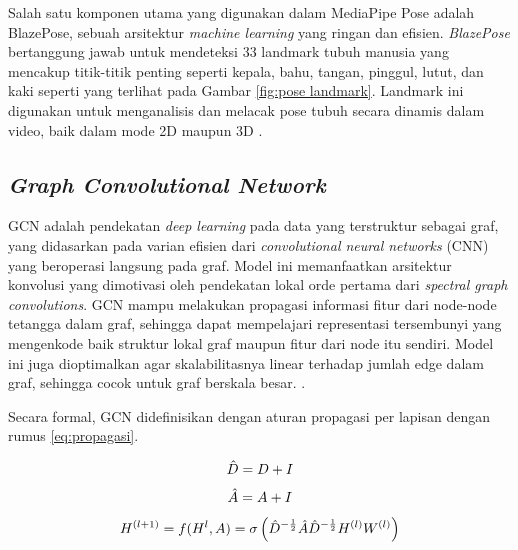 Salah satu komponen utama yang digunakan dalam MediaPipe Pose adalah BlazePose, sebuah arsitektur \textit{machine learning} yang ringan dan efisien. \textit{BlazePose} bertanggung jawab untuk mendeteksi 33 landmark tubuh manusia yang mencakup titik-titik penting seperti kepala, bahu, tangan, pinggul, lutut, dan kaki seperti yang terlihat pada Gambar \ref{fig:pose landmark}. Landmark ini digunakan untuk menganalisis dan melacak pose tubuh secara dinamis dalam video, baik dalam mode 2D maupun 3D \cite{bazarevsky2020}.\par

\subsection{\textit{Graph Convolutional Network}} \label{II.GCN}
GCN adalah pendekatan \textit{deep learning} pada data yang terstruktur sebagai graf, yang didasarkan pada varian efisien dari \textit{convolutional neural networks} (CNN) yang beroperasi langsung pada graf.  Model ini memanfaatkan arsitektur konvolusi yang dimotivasi oleh pendekatan lokal orde pertama dari \textit{spectral graph convolutions}. GCN mampu melakukan propagasi informasi fitur dari node-node tetangga dalam graf, sehingga dapat mempelajari representasi tersembunyi yang mengenkode baik struktur lokal graf maupun fitur dari node itu sendiri. Model ini juga dioptimalkan agar skalabilitasnya linear terhadap jumlah edge dalam graf, sehingga cocok untuk graf berskala besar. \cite{Kipf2016}. \par

Secara formal, GCN didefinisikan dengan aturan propagasi per lapisan dengan rumus \ref{eq:propagasi}. \par

\begin{equation}
    \vspace{20pt} 
    \hat{D} = D + I
\label{eq:normalisasi D}
\end{equation}
\begin{equation}
    \vspace{20pt} 
    \hat{A} = A + I
\label{eq:normalisasi A}
\end{equation}
\begin{equation}
    \vspace{20pt} 
    H^{(l+1)} = f(H^l,A) = \sigma \left( \hat{D}^{- \frac{1}{2}} \hat{A} \hat{D}^{- \frac{1}{2}} H^{(l)} W^{(l)} \right)
\label{eq:propagasi}
\end{equation}

